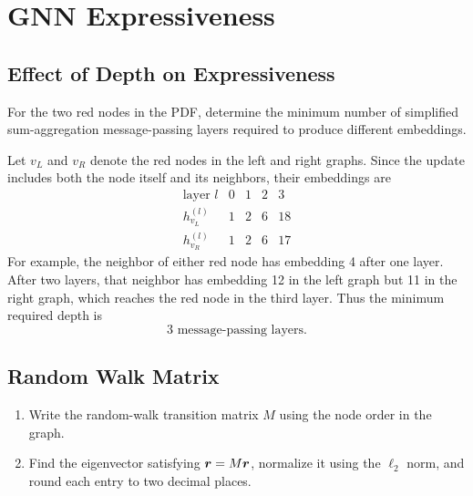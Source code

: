 \clearpage
\section{GNN Expressiveness}

\subsection{Effect of Depth on Expressiveness}

For the two red nodes in the PDF, determine the minimum number of simplified
sum-aggregation message-passing layers required to produce different
embeddings.

\begin{solution}
Let $v_L$ and $v_R$ denote the red nodes in the left and right graphs.  Since
the update includes both the node itself and its neighbors, their embeddings
are
\[
\begin{array}{c|cccc}
  \text{layer }l & 0 & 1 & 2 & 3 \\ \hline
  h_{v_L}^{(l)} & 1 & 2 & 6 & 18 \\
  h_{v_R}^{(l)} & 1 & 2 & 6 & 17
\end{array}
\]
For example, the neighbor of either red node has embedding 4 after one layer.
After two layers, that neighbor has embedding 12 in the left graph but 11 in
the right graph, which reaches the red node in the third layer.  Thus the
minimum required depth is
\[
  \boxed{3\text{ message-passing layers}}.
\]
\end{solution}

\subsection{Random Walk Matrix}

\begin{enumerate}[label=(\roman*)]
  \item Write the random-walk transition matrix $M$ using the node order in
    the graph.
  \item Find the eigenvector satisfying $\bm{r}=M\bm{r}$, normalize it
    using the $\ell_2$ norm, and round each entry to two decimal places.
\end{enumerate}

